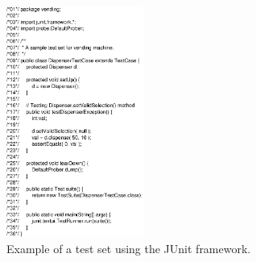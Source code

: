 \begin{figure}[!ht]
\begin{center}
\includegraphics[width=0.4\textwidth]{fig/junit-test-case}
\caption{\label{fig:junit}Example of a test set using the JUnit
framework.}
\end{center}
\end{figure}
